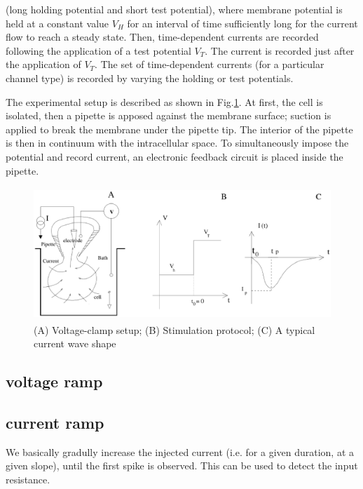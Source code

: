 (long holding potential and short test potential), where membrane potential is
held at a constant value $V_H$ for an interval of time sufficiently long for the
current flow to reach a steady state. Then, time-dependent currents are recorded
following the application of a test potential $V_T$. The current is recorded
just after the application of $V_T$. The set of time-dependent currents (for a
particular channel type) is recorded by varying the holding or test potentials.

The experimental setup is described as shown in Fig.\ref{fig:voltage_clamp2}. At
first, the cell is isolated, then a pipette is apposed against the membrane
surface; suction is applied to break the membrane under the pipette tip. The
interior of the pipette is then in continuum with the intracellular space. To
simultaneously impose the potential and record current, an electronic feedback
circuit is placed inside the pipette.

\begin{figure}[hbt]
  \centerline{\includegraphics[height=5cm,
  angle=0]{./images/voltage_clamp2.eps}}
  \caption{(A) Voltage-clamp setup; (B) Stimulation protocol; (C) A typical
  current wave shape \citep{wang2004pe}}
  \label{fig:voltage_clamp2}
\end{figure}





\subsection{voltage ramp}
\label{sec:voltage-ramp}

\subsection{current ramp}
\label{sec:current-ramp}

We basically gradully increase the injected current (i.e. for a given duration,
at a given slope), until the first spike is observed. This can be used to detect
the input resistance.

